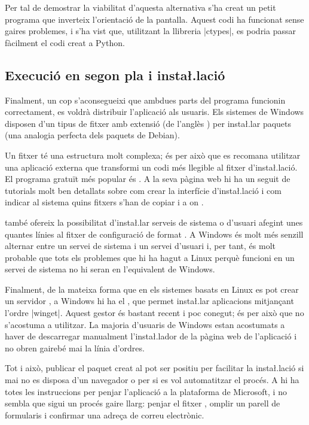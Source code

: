 Per tal de demostrar la viabilitat d'aquesta alternativa s'ha creat un petit
programa que inverteix l'orientació de la pantalla. Aquest codi ha funcionat
sense gaires problemes, i s'ha vist que, utilitzant la llibreria \ord|ctypes|,
es podria passar fàcilment el codi creat a Python.

\subsection{Execució en segon pla i insta\l.lació}

Finalment, un cop s'aconsegueixi que ambdues parts del programa funcionin
correctament, es voldrà distribuir l'aplicació als usuaris. Els sistemes de
Windows disposen d'un tipus de fitxer amb extensió  (de l'anglès
) per insta\l.lar paquets (una analogia perfecta dels
paquets de Debian).

Un fitxer  té una estructura molt complexa; és per això que es recomana
utilitzar una aplicació externa que transformi un codi més llegible al fitxer
d'insta\l.lació. El programa gratuït més popular és . A la seva pàgina
web hi ha un seguit de tutorials molt ben detallats sobre com crear la interfície
d'insta\l.lació i com indicar al sistema quins fitxers s'han de copiar i a on
\cite{Wix}.

 també ofereix la possibilitat d'insta\l.lar serveis de sistema o
d'usuari afegint unes quantes línies al fitxer de configuració de format
. A Windows és molt més senzill alternar entre un servei de sistema
i un servei d'usuari i, per tant, és molt probable que tots els problemes que hi ha
hagut a Linux perquè funcioni  en un servei de sistema no hi
seran en l'equivalent de Windows.

Finalment, de la mateixa forma que en els sistemes basats en Linux es pot crear
un servidor , a Windows hi ha el , que
permet insta\l.lar aplicacions mitjançant l'ordre \ord|winget|. Aquest gestor
és bastant recent i poc conegut; és per això que no s'acostuma a utilitzar. La
majoria d'usuaris de Windows estan acostumats a haver de descarregar manualment
l'insta\l.lador de la pàgina web de l'aplicació i no obren gairebé mai la línia
d'ordres.

Tot i això, publicar el paquet creat al  pot ser positiu
per facilitar la insta\l.lació si mai no es disposa d'un navegador o per si es vol
automatitzar el procés. A \cite{WPM} hi ha totes les instruccions per
penjar l'aplicació a la plataforma de Microsoft, i no sembla que sigui un
procés gaire llarg: penjar el fitxer , omplir un parell de formularis
i confirmar una adreça de correu electrònic.

